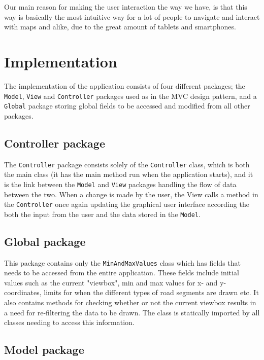 \documentclass[a4paper,11pt]{article}
\begin{document}
Our main reason for making the user interaction the way we have, is that this way is basically the most intuitive way for a lot of people to navigate and interact with maps and alike, due to the great amount of tablets and smartphones.

\pagebreak
\section{Implementation} %
\label{sec:Implementation} %
The implementation of the application consists of four different packages; the \texttt{Model}, \texttt{View} and \texttt{Controller} packages used as in the MVC design pattern, and a \texttt{Global} package storing global fields to be accessed and modified from all other packages.


\subsection{Controller package} %
The \texttt{Controller} package consists solely of the \texttt{Controller} class, which is both the main class (it has the main method run when the application starts), and it is the link between the \texttt{Model} and \texttt{View} packages handling the flow of data between the two. When a change is made by the user, the View calls a method in the \texttt{Controller} once again updating the graphical user interface according the both the input from the user and the data stored in the \texttt{Model}.

\subsection{Global package} %
This package contains only the \texttt{MinAndMaxValues} class which has fields that needs to be accessed from the entire application. These fields include initial values such as the current "viewbox", min and max values for x- and y-coordinates, limits for when the different types of road segments are drawn etc. It also contains methods for checking whether or not the current viewbox results in a need for re-filtering the data to be drawn. The class is statically imported by all classes needing to access this information.

\subsection{Model package} %
\end{document}
